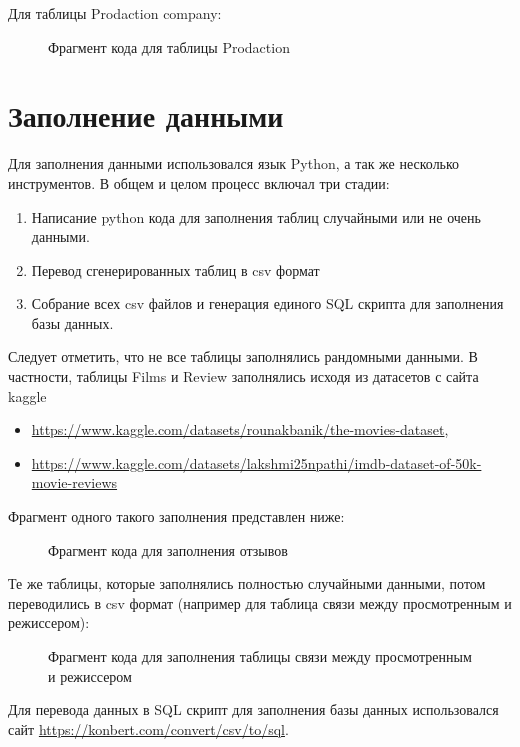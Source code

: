  Для таблицы Prodaction company:
\begin{figure} [H]
    \caption{Фрагмент кода для таблицы Prodaction}
\end{figure}

\section{Заполнение данными}
Для заполнения данными использовался язык Python, а так же несколько инструментов. В общем и целом процесс
включал три стадии:

\begin{enumerate}
\item Написание python кода для заполнения таблиц случайными или не очень данными.
\item Перевод сгенерированных таблиц в csv формат
\item Собрание всех csv файлов и генерация единого SQL скрипта для заполнения базы данных.
\end{enumerate}

Следует отметить, что не все таблицы заполнялись рандомными данными. В частности, таблицы Films и
Review заполнялись исходя из датасетов с сайта kaggle 
\begin{itemize}
\item \url{https://www.kaggle.com/datasets/rounakbanik/the-movies-dataset},
\item \url{https://www.kaggle.com/datasets/lakshmi25npathi/imdb-dataset-of-50k-movie-reviews}
\end{itemize}

Фрагмент одного такого заполнения представлен ниже:

\begin{figure} [H]
    \caption{Фрагмент кода для заполнения отзывов}
\end{figure}

Те же таблицы, которые заполнялись полностью случайными данными, потом переводились в csv формат
(например для таблица связи между просмотренным и режиссером):
\begin{figure} [H]
    \caption{Фрагмент кода для заполнения таблицы связи между просмотренным и режиссером}
\end{figure}

Для перевода данных в SQL скрипт для заполнения базы данных использовался сайт \url{https://konbert.com/convert/csv/to/sql}.


